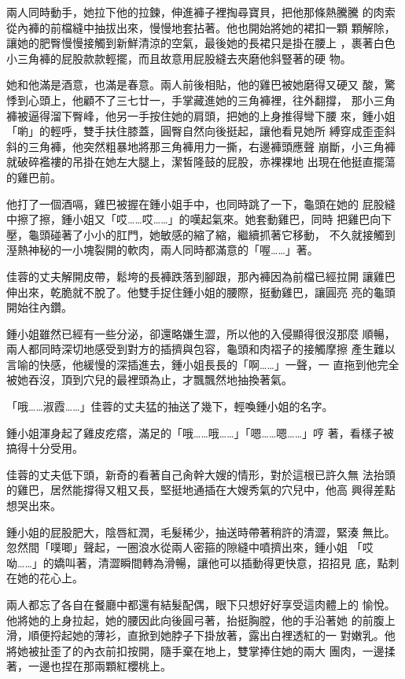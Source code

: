 兩人同時動手，她拉下他的拉鍊，伸進褲子裡掏尋寶貝，把他那條熱騰騰
的肉索從內褲的前檔縫中抽拔出來，慢慢地套拈著。他也開始將她的裙扣一顆
顆解除，讓她的肥臀慢慢接觸到新鮮清涼的空氣，最後她的長裙只是掛在腰上
，裹著白色小三角褲的屁股款款輕擺，而且故意用屁股縫去夾磨他斜豎著的硬
物。

她和他滿是酒意，也滿是春意。兩人前後相貼，他的雞巴被她磨得又硬又
酸，驚悸到心頭上，他顧不了三七廿一，手掌藏進她的三角褲裡，往外翻撐，
那小三角褲被逼得溜下臀峰，他另一手按住她的肩頭，把她的上身推得彎下腰
來，鍾小姐「喲」的輕呼，雙手扶住膝蓋，圓臀自然向後挺起，讓他看見她所
縛穿成歪歪斜斜的三角褲，他突然粗暴地將那三角褲用力一撕，右邊褲頭應聲
崩斷，小三角褲就破碎襤褸的吊掛在她左大腿上，潔皙隆鼓的屁股，赤裸裸地
出現在他挺直擺蕩的雞巴前。

他打了一個酒嗝，雞巴被握在鍾小姐手中，也同時跳了一下，龜頭在她的
屁股縫中擦了擦，鍾小姐又「哎……哎……」的嘆起氣來。她套動雞巴，同時
把雞巴向下壓，龜頭碰著了小小的肛門，她敏感的縮了縮，繼續抓著它移動，
不久就接觸到溼熱神秘的一小塊裂開的軟肉，兩人同時都滿意的「喔……」著。

佳蓉的丈夫解開皮帶，鬆垮的長褲跌落到腳跟，那內褲因為前檔已經拉開
讓雞巴伸出來，乾脆就不脫了。他雙手捉住鍾小姐的腰際，挺動雞巴，讓圓亮
亮的龜頭開始往內鑽。

鍾小姐雖然已經有一些分泌，卻還略嫌生澀，所以他的入侵顯得很沒那麼
順暢，兩人都同時深切地感受到對方的插擠與包容，龜頭和肉褶子的接觸摩擦
產生難以言喻的快感，他緩慢的深插進去，鍾小姐長長的「啊……」一聲，一
直拖到他完全被她吞沒，頂到穴兒的最裡頭為止，才飄飄然地抽換著氣。

「哦……淑霞……」佳蓉的丈夫猛的抽送了幾下，輕喚鍾小姐的名字。

鍾小姐渾身起了雞皮疙瘩，滿足的「哦……哦……」「嗯……嗯……」哼
著，看樣子被搞得十分受用。

佳蓉的丈夫低下頭，新奇的看著自己肏幹大嫂的情形，對於這根已許久無
法抬頭的雞巴，居然能撐得又粗又長，堅挺地通插在大嫂秀氣的穴兒中，他高
興得差點想哭出來。

鍾小姐的屁股肥大，陰唇紅潤，毛髮稀少，抽送時帶著稍許的清澀，緊湊
無比。忽然間「噗唧」聲起，一圈浪水從兩人密箍的隙縫中噴擠出來，鍾小姐
「哎呦……」的嬌叫著，清澀瞬間轉為滑暢，讓他可以插動得更快意，招招見
底，點刺在她的花心上。

兩人都忘了各自在餐廳中都還有結髮配偶，眼下只想好好享受這肉體上的
愉悅。他將她的上身拉起，她的腰因此向後圓弓著，抬挺胸膛，他的手沿著她
的前腹上滑，順便捋起她的薄衫，直掀到她脖子下掛放著，露出白裡透紅的一
對嫩乳。他將她被扯歪了的內衣前扣按開，隨手棄在地上，雙掌捧住她的兩大
團肉，一邊揉著，一邊也捏在那兩顆紅櫻桃上。


